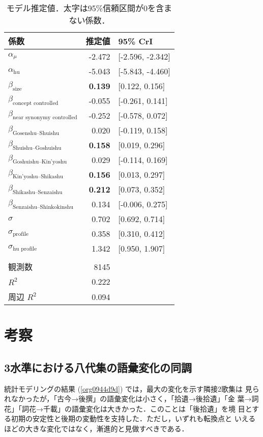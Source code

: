 \documentclass[submit]{ipsj}
\renewcommand{\ref}{\cref}
\begin{document}
\begin{table}[tb]
\caption{\label{tab:orgdb920bb}モデル推定値．太字は95\%信頼区間が0を含まない係数．}
\centering
\begin{tabular}{lrl}
係数 & 推定値 & 95\% CrI\\
\hline
\(\alpha_{\mu}\) & -2.472 & {[}-2.596, -2.342]\\
\(\alpha_{\text{hu}}\) & -5.043 & {[}-5.843, -4.460]\\
\(\beta_{\text{size}}\) & \textbf{0.139} & {[}0.122, 0.156]\\
\(\beta_{\text{concept controlled}}\) & -0.055 & {[}-0.261, 0.141]\\
\(\beta_{\text{near synonymy controlled}}\) & -0.252 & {[}-0.578, 0.072]\\
\(\beta_{\text{Gosenshu--Shuishu}}\) & 0.020 & {[}-0.119, 0.158]\\
\(\beta_{\text{Shuishu--Goshuishu}}\) & \textbf{0.158} & {[}0.019, 0.296]\\
\(\beta_{\text{Goshuishu--Kin'yoshu}}\) & 0.029 & {[}-0.114, 0.169]\\
\(\beta_{\text{Kin'yoshu--Shikashu}}\) & \textbf{0.156} & {[}0.013, 0.297]\\
\(\beta_{\text{Shikashu--Senzaishu}}\) & \textbf{0.212} & {[}0.073, 0.352]\\
\(\beta_{\text{Senzaishu--Shinkokinshu}}\) & 0.134 & {[}-0.006, 0.275]\\
\(\sigma\) & 0.702 & {[}0.692, 0.714]\\
\(\sigma_{\text{profile}}\) & 0.358 & {[}0.310, 0.412]\\
\(\sigma_{\text{hu profile}}\) & 1.342 & {[}0.950, 1.907]\\
 &  & \\
観測数 & 8145 & \\
\(R^2\) & 0.222 & \\
周辺 \(R^2\) & 0.094 & \\
\end{tabular}
\end{table}
\section{考察\label{org3874a1f}}
\label{sec:orge85707b}
\subsection{3水準における八代集の語彙変化の同調\label{org30a28c4}}
\label{sec:org94aa2d9}
統計モデリングの結果 (\ref{org0944d9d}) では，最大の変化を示す隣接2歌集は
見られなかったが，「古今→後撰」の語彙変化は小さく，「拾遺→後拾遺」「金
葉→詞花」「詞花→千載」の語彙変化は大きかった．このことは「後拾遺」を境
目とする初期の安定性と後期の変動性を支持した．ただし，いずれも転換点と
いえるほどの大きな変化ではなく，漸進的と見做すべきである．
\end{document}
